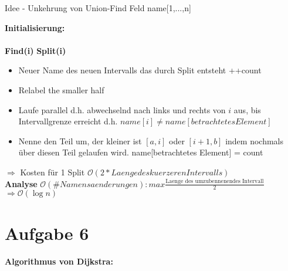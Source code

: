 \documentclass[10pt,a4paper]{article}
\begin{document}
Idee - Unkehrung von Union-Find
Feld name[1,...,n]

\begin{algorithm}[H]
	\textbf{Initialisierung:} \\
	~\\
	\textbf{Find(i)}
	\textbf{Split(i)}
	\begin{itemize}
		\item Neuer Name des neuen Intervalls das durch Split entsteht ++count
		\item Relabel the smaller half
		\item Laufe parallel d.h. abwechselnd nach links und rechts von $i$ aus, bis Intervallgrenze erreicht d.h. $name[i]\neq name[betrachtetes Element]$
		\item Nenne den Teil um, der kleiner ist $[a,i]$ oder $[i+1,b]$ indem nochmals über diesen Teil gelaufen wird. name[betrachtetes Element] = count
	\end{itemize}
\end{algorithm}
	\begin{center}
		\resizebox{.5\columnwidth}{!}{
			
		}
	\end{center}
	$\Rightarrow$ Kosten für 1 Split $\mathcal{O}(2*Laenge des kuerzeren Intervalls)$ \\
	\textbf{Analyse} $\mathcal{O}(\#Namensaenderungen): max\frac{\text{Laenge des umzubennenendes Intervall}}{2}$ $\Rightarrow\mathcal{O}(\log n)$




\section*{Aufgabe 6}
\paragraph{Algorithmus von Dijkstra:}~\\
\begin{algorithm}[H]
	
\end{algorithm}
\end{document}
